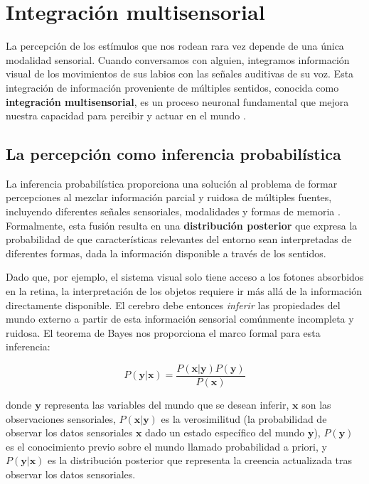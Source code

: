 \section{Integración multisensorial}
\label{sec:integracion_multisensorial}

La percepción de los estímulos que nos rodean rara vez depende de una única modalidad sensorial. Cuando conversamos con alguien, integramos información visual de los movimientos de sus labios con las señales auditivas de su voz. Esta integración de información proveniente de múltiples sentidos, conocida como \textbf{integración multisensorial}, es un proceso neuronal fundamental que mejora nuestra capacidad para percibir y actuar en el mundo \citep{stein2012new}.

\subsection{La percepción como inferencia probabilística}
\label{subsec:percepcion_bayesiana}

La inferencia probabilística proporciona una solución al problema de formar percepciones al mezclar información parcial y ruidosa de múltiples fuentes, incluyendo diferentes señales sensoriales, modalidades y formas de memoria \citep{echeveste2020cortical}. Formalmente, esta fusión resulta en una \textbf{distribución posterior} que expresa la probabilidad de que características relevantes del entorno sean interpretadas de diferentes formas, dada la información disponible a través de los sentidos.

Dado que, por ejemplo, el sistema visual solo tiene acceso a los fotones absorbidos en la retina, la interpretación de los objetos requiere ir más allá de la información directamente disponible. El cerebro debe entonces \textit{inferir} las propiedades del mundo externo a partir de esta información sensorial comúnmente incompleta y ruidosa. El teorema de Bayes nos proporciona el marco formal para esta inferencia:

\begin{equation}
P(\mathbf{y}|\mathbf{x}) = \frac{P(\mathbf{x}|\mathbf{y})P(\mathbf{y})}{P(\mathbf{x})}
\label{eq:bayes_perception}
\end{equation}

donde $\mathbf{y}$ representa las variables del mundo que se desean inferir, $\mathbf{x}$ son las observaciones sensoriales, $P(\mathbf{x}|\mathbf{y})$ es la verosimilitud (la probabilidad de observar los datos sensoriales $\mathbf{x}$ dado un estado específico del mundo $\mathbf{y}$), $P(\mathbf{y})$ es el conocimiento previo sobre el mundo llamado probabilidad a priori, y $P(\mathbf{y}|\mathbf{x})$ es la distribución posterior que representa la creencia actualizada tras observar los datos sensoriales.

